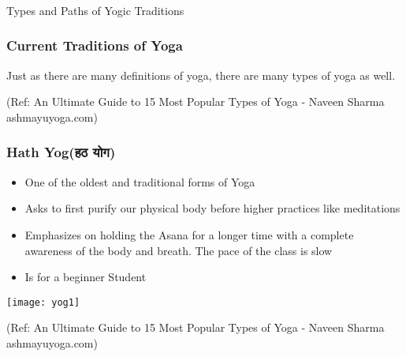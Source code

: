 \begin{frame}[fragile]\frametitle{}
\begin{center}
{\Large Types and Paths of Yogic Traditions}
\end{center}
\end{frame}


\begin{frame}[fragile]\frametitle{Current Traditions of Yoga}
Just as there are many definitions of yoga, there are many types of yoga as well. 

\tiny{(Ref: An Ultimate Guide to 15 Most Popular Types of Yoga - Naveen Sharma ashmayuyoga.com)}
\end{frame}

\begin{frame}[fragile]\frametitle{Hath Yog(हठ योग)}
	\begin{itemize}
	\item One of the oldest and traditional forms of Yoga
	\item Asks to first purify our physical body before higher practices like meditations
	\item Emphasizes on holding the Asana for a longer time with a complete awareness of the body and breath. The pace of the class is slow
	\item Is for a beginner Student
	\end{itemize}

\begin{center}
\texttt{[image: yog1]}

\tiny{(Ref: An Ultimate Guide to 15 Most Popular Types of Yoga - Naveen Sharma ashmayuyoga.com)}
\end{center}

\end{frame}

